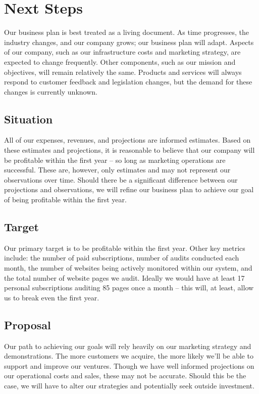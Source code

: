 {\let\cleardoublepage\relax \chapter*{Next Steps}}

Our business plan is best treated as a living document. As time progresses, the industry changes, and our company grows; our business plan will adapt. Aspects of our company, such as our infrastructure costs and marketing strategy, are expected to change frequently. Other components, such as our mission and objectives, will remain relatively the same. Products and services will always respond to customer feedback and legislation changes, but the demand for these changes is currently unknown.

\section{Situation}

All of our expenses, revenues, and projections are informed estimates. Based on these estimates and projections, it is reasonable to believe that our company will be profitable within the first year -- so long as marketing operations are successful. These are, however, only estimates and may not represent our observations over time. Should there be a significant difference between our projections and observations, we will refine our business plan to achieve our goal of being profitable within the first year. 

\section{Target}

Our primary target is to be profitable within the first year. Other key metrics include: the number of paid subscriptions, number of audits conducted each month, the number of websites being actively monitored within our system, and the total number of website pages we audit. Ideally we would have at least 17 personal subscriptions auditing 85 pages once a month -- this will, at least, allow us to break even the first year.

\section{Proposal}

Our path to achieving our goals will rely heavily on our marketing strategy and demonstrations. The more customers we acquire, the more likely we'll be able to support and improve our ventures. Though we have well informed projections on our operational costs and sales, these may not be accurate. Should this be the case, we will have to alter our strategies and potentially seek outside investment.  